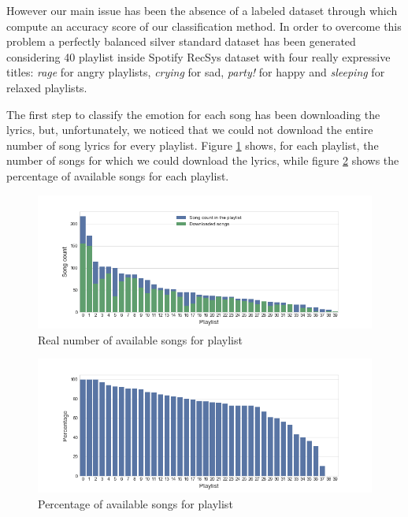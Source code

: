 However our main issue has been the absence of a labeled dataset through which compute an accuracy score of our classification method. In order to overcome this problem a perfectly balanced silver standard dataset has been generated considering 40 playlist inside Spotify RecSys\cite{recsys} dataset with four really expressive titles: \textit{rage} for angry playlists, \textit{crying} for sad, \textit{party!} for happy and \textit{sleeping} for relaxed playlists. \par

The first step to classify the emotion for each song has been downloading the lyrics, but, unfortunately, we noticed that we could not download the entire number of song lyrics for every playlist. Figure \ref{fig:rsongs} shows, for each playlist, the number of songs for which we could download the lyrics, while figure \ref{fig:psongs} shows the percentage of available songs for each playlist. 

\begin{figure}[H]
\centering
\includegraphics[width=1\textwidth]{./chapters/chapter5/images/silver_standard_available_songs.png}
\caption{Real number of available songs for playlist}
\label{fig:rsongs}
\end{figure}

\begin{figure}[H]
\centering
\includegraphics[width=1\textwidth]{./chapters/chapter5/images/silver_standard_percentage_available_songs.png}
\caption{Percentage of available songs for playlist}
\label{fig:psongs}
\end{figure}

